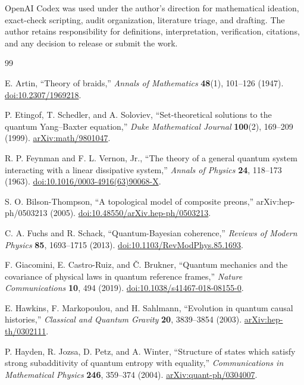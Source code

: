 \documentclass[11pt]{article}
\theoremstyle{definition}
\theoremstyle{remark}
\begin{document}
OpenAI Codex was used under the author's direction for mathematical ideation, exact-check scripting, audit organization, literature triage, and drafting. The author retains responsibility for definitions, interpretation, verification, citations, and any decision to release or submit the work.

\begin{thebibliography}{99}
\raggedright
\small

E. Artin, ``Theory of braids,'' \emph{Annals of Mathematics} \textbf{48}(1), 101--126 (1947). \href{https://doi.org/10.2307/1969218}{doi:10.2307/1969218}.

P. Etingof, T. Schedler, and A. Soloviev, ``Set-theoretical solutions to the quantum Yang--Baxter equation,'' \emph{Duke Mathematical Journal} \textbf{100}(2), 169--209 (1999). \href{https://arxiv.org/abs/math/9801047}{arXiv:math/9801047}.

R. P. Feynman and F. L. Vernon, Jr., ``The theory of a general quantum system interacting with a linear dissipative system,'' \emph{Annals of Physics} \textbf{24}, 118--173 (1963). \href{https://doi.org/10.1016/0003-4916(63)90068-X}{doi:10.1016/0003-4916(63)90068-X}.

S. O. Bilson-Thompson, ``A topological model of composite preons,'' arXiv:hep-ph/0503213 (2005). \href{https://doi.org/10.48550/arXiv.hep-ph/0503213}{doi:10.48550/arXiv.hep-ph/0503213}.

C. A. Fuchs and R. Schack, ``Quantum-Bayesian coherence,'' \emph{Reviews of Modern Physics} \textbf{85}, 1693--1715 (2013). \href{https://doi.org/10.1103/RevModPhys.85.1693}{doi:10.1103/RevModPhys.85.1693}.

F. Giacomini, E. Castro-Ruiz, and \v{C}. Brukner, ``Quantum mechanics and the covariance of physical laws in quantum reference frames,'' \emph{Nature Communications} \textbf{10}, 494 (2019). \href{https://doi.org/10.1038/s41467-018-08155-0}{doi:10.1038/s41467-018-08155-0}.

E. Hawkins, F. Markopoulou, and H. Sahlmann, ``Evolution in quantum causal histories,'' \emph{Classical and Quantum Gravity} \textbf{20}, 3839--3854 (2003). \href{https://arxiv.org/abs/hep-th/0302111}{arXiv:hep-th/0302111}.

P. Hayden, R. Jozsa, D. Petz, and A. Winter, ``Structure of states which satisfy strong subadditivity of quantum entropy with equality,'' \emph{Communications in Mathematical Physics} \textbf{246}, 359--374 (2004). \href{https://arxiv.org/abs/quant-ph/0304007}{arXiv:quant-ph/0304007}.


\end{thebibliography}
\end{document}
